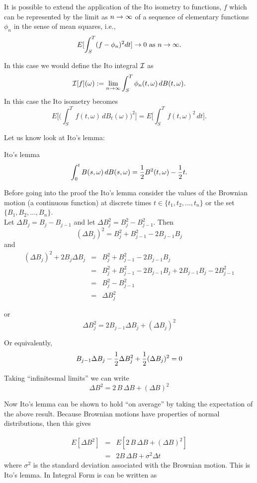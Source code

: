 It is possible to extend the application of the Ito isometry to functions, $f$ which can be represented by the limit as $n\rightarrow\infty$ of a sequence of elementary functions $\phi_n$ in the sense of mean squares, i.e., 
$$E[\int_S^T (f- \phi_n)^2 dt] \rightarrow 0 \hbox{~as~} n\rightarrow\infty.$$

In this case we would define the Ito integral $\cal I$ as $${\cal I}[f](\omega) := \lim_{n\rightarrow\infty}\int_S^T \phi_n(t,\omega)\, dB(t,\omega).$$ In this case the Ito isometry becomes
$$E\Big[\Big( \int_S^T\, f(t,\omega)\, dB_t(\omega)\Big)^2\Big] = E\Big[\int_S^T\, f(t,\omega)^2 \, dt\Big].$$ 

Let us know look at Ito's lemma:
\begin{lemma}{Ito's lemma}
$$\int_0^t B(s,\omega)\, dB(s,\omega) = {1\over2}B^2(t, \omega) - {1\over2}t.$$
\end{lemma}

Before going into the proof the Ito's lemma consider the values of the Brownian motion (a continuous function) at discrete times $t \in \{t_1, t_2, ..., t_n \}$ or the set $\{B_1, B_2, ..., B_n\}$.\\

Let $\Delta B_j = B_j - B_{j-1}$ and let $\Delta B^2_j = B^2_j - B^2_{j-1}$. Then $$(\Delta B_j)^2 = B^2_j + B^2_{j-1} - 2B_{j-1}B_j$$ and 
\begin{eqnarray*}
(\Delta B_j)^2 + 2B_j\Delta B_j &=& B^2_j + B^2_{j-1} - 2B_{j-1}B_j \\
& = & B^2_j + B^2_{j-1}  - 2B_{j-1}B_j + 2B_{j-1}B_j  - 2B^2_{j-1} \\
& = & B^2_j - B^2_{j-1} \\
& = & \Delta B^2_j
\end{eqnarray*}

or $$ \Delta B^2_j = 2B_{j-1}\Delta B_j + (\Delta B_j)^2$$

Or equivalently, 
$$B_{j-1}\Delta B_j - {1\over2}\Delta B^2_j  + {1\over2}(\Delta B_j)^2 = 0$$

Taking ``infinitesmal limits'' we can write $$\Delta B^2 = 2\,B\, \Delta B + (\Delta B)^2$$

Now Ito's lemma can be shown to hold ``on average'' by taking the expectation of the above result. Because Brownian motions have properties of normal distributions, then this gives

\begin{eqnarray*}
E[\Delta B^2] &=& E[2\,B\, \Delta B + (\Delta B)^2]\\
&=& 2B\, \Delta B + \sigma^2 \Delta t
\end{eqnarray*}
where $\sigma^2$ is the standard deviation associated with the Brownian motion. This is Ito's lemma. In Integral Form is can be written as 

